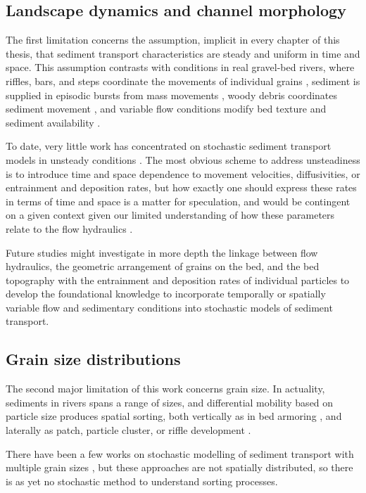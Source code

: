 \subsection{Landscape dynamics and channel morphology}

The first limitation concerns the assumption, implicit in every chapter of this thesis, that sediment transport characteristics are steady and uniform in time and space.
This assumption contrasts with conditions in real gravel-bed rivers, where riffles, bars, and steps coordinate the movements of individual grains \citep{Ashmore1998,McDowell2020}, sediment is supplied in episodic bursts from mass movements \citep{Benda1990, Muller2018}, woody debris coordinates sediment movement \citep{Eaton2012,Reid2019}, and variable flow conditions modify bed texture and sediment availability \citep{Mao2012,Phillips2018}.

To date, very little work has concentrated on stochastic sediment transport models in unsteady conditions \citep[e.g.][]{Bohorquez2016}.
The most obvious scheme to address unsteadiness is to introduce time and space dependence to movement velocities, diffusivities, or entrainment and deposition rates, but how exactly one should express these rates in terms of time and space is a matter for speculation, and would be contingent on a given context given our limited understanding of how these parameters relate to the flow hydraulics \citep[e.g.][]{Heyman2016}.

Future studies might investigate in more depth the linkage between flow hydraulics, the geometric arrangement of grains on the bed, and the bed topography with the entrainment and deposition rates of individual particles to develop the foundational knowledge to incorporate temporally or spatially variable flow and sedimentary conditions into stochastic models of sediment transport.

\subsection{Grain size distributions}

The second major limitation of this work concerns grain size.
In actuality, sediments in rivers spans a range of sizes, and differential mobility based on particle size produces spatial sorting, both vertically as in bed armoring \citep{Parker1982,Wilcock1989,Aberle2006}, and laterally as patch, particle cluster, or riffle development \citep{Nelson2014,Venditti2017}.

There have been a few works on stochastic modelling of sediment transport with multiple grain sizes \citep{Sun2000,Parker2000}, but these approaches are not spatially distributed, so there is as yet no stochastic method to understand sorting processes. 

